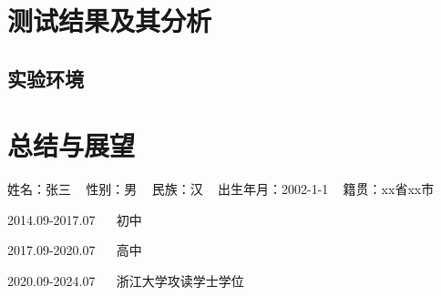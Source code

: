 \clearpage
\section{测试结果及其分析}

\subsection{实验环境}


\clearpage
\section{总结与展望}

\clearpage
{}
\putbib

\clearpage
{}


姓名：张三 ~ 性别：男 ~  民族：汉 ~ 出生年月：2002-1-1 ~  籍贯：xx省xx市

2014.09-2017.07 ~~  初中

2017.09-2020.07 ~~  高中

2020.09-2024.07 ~~  浙江大学攻读学士学位

